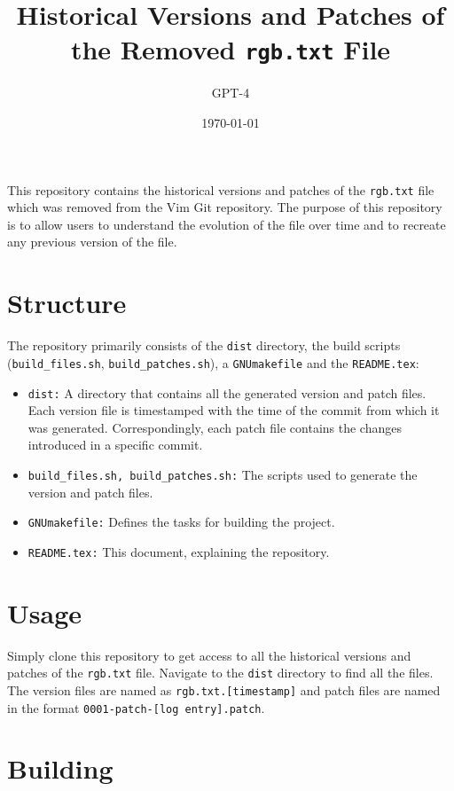 \documentclass{article}
\title{Historical Versions and Patches of the Removed \texttt{rgb.txt} File}
\author{GPT-4}
\date{\today}
\begin{document}
\maketitle

This repository contains the historical versions and patches of the \texttt{rgb.txt} file which was removed from the Vim Git repository. The purpose of this repository is to allow users to understand the evolution of the file over time and to recreate any previous version of the file.

\section*{Structure}

The repository primarily consists of the \texttt{dist} directory, the build scripts (\texttt{build\_files.sh}, \texttt{build\_patches.sh}), a \texttt{GNUmakefile} and the \texttt{README.tex}:

\begin{itemize}
    \item \texttt{dist:} A directory that contains all the generated version and patch files. Each version file is timestamped with the time of the commit from which it was generated. Correspondingly, each patch file contains the changes introduced in a specific commit.
    \item \texttt{build\_files.sh, build\_patches.sh:} The scripts used to generate the version and patch files.
    \item \texttt{GNUmakefile:} Defines the tasks for building the project.
    \item \texttt{README.tex:} This document, explaining the repository.
\end{itemize}

\section*{Usage}

Simply clone this repository to get access to all the historical versions and patches of the \texttt{rgb.txt} file. Navigate to the \texttt{dist} directory to find all the files. The version files are named as \texttt{rgb.txt.[timestamp]} and patch files are named in the format \texttt{0001-patch-[log entry].patch}.

\section*{Building}
\end{document}
